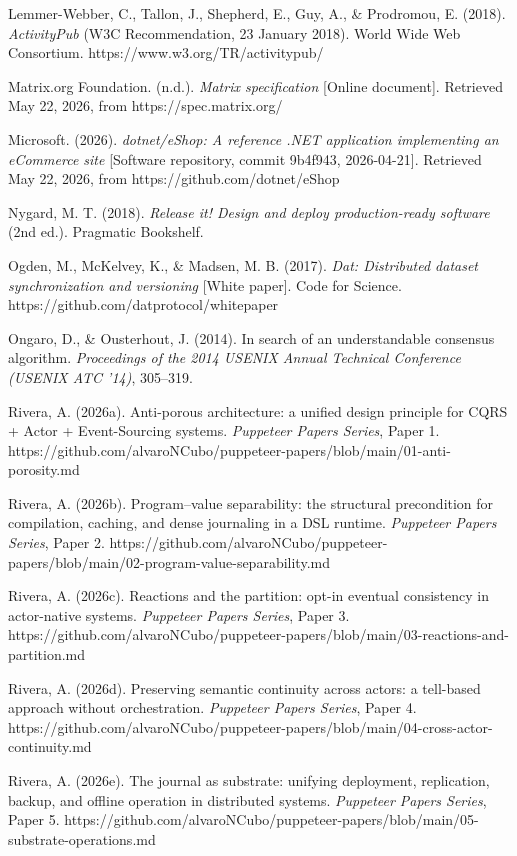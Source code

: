 \documentclass[
]{article}
\begin{document}
Lemmer-Webber, C., Tallon, J., Shepherd, E., Guy, A., \& Prodromou, E.
(2018). \emph{ActivityPub} (W3C Recommendation, 23 January 2018). World
Wide Web Consortium. https://www.w3.org/TR/activitypub/

Matrix.org Foundation. (n.d.). \emph{Matrix specification} {[}Online
document{]}. Retrieved May 22, 2026, from https://spec.matrix.org/

Microsoft. (2026). \emph{dotnet/eShop: A reference .NET application
implementing an eCommerce site} {[}Software repository, commit 9b4f943,
2026-04-21{]}. Retrieved May 22, 2026, from
https://github.com/dotnet/eShop

Nygard, M. T. (2018). \emph{Release it! Design and deploy
production-ready software} (2nd ed.). Pragmatic Bookshelf.

Ogden, M., McKelvey, K., \& Madsen, M. B. (2017). \emph{Dat: Distributed
dataset synchronization and versioning} {[}White paper{]}. Code for
Science. https://github.com/datprotocol/whitepaper

Ongaro, D., \& Ousterhout, J. (2014). In search of an understandable
consensus algorithm. \emph{Proceedings of the 2014 USENIX Annual
Technical Conference (USENIX ATC '14)}, 305--319.

Rivera, A. (2026a). Anti-porous architecture: a unified design principle
for CQRS + Actor + Event-Sourcing systems. \emph{Puppeteer Papers
Series}, Paper 1.
https://github.com/alvaroNCubo/puppeteer-papers/blob/main/01-anti-porosity.md

Rivera, A. (2026b). Program--value separability: the structural
precondition for compilation, caching, and dense journaling in a DSL
runtime. \emph{Puppeteer Papers Series}, Paper 2.
https://github.com/alvaroNCubo/puppeteer-papers/blob/main/02-program-value-separability.md

Rivera, A. (2026c). Reactions and the partition: opt-in eventual
consistency in actor-native systems. \emph{Puppeteer Papers Series},
Paper 3.
https://github.com/alvaroNCubo/puppeteer-papers/blob/main/03-reactions-and-partition.md

Rivera, A. (2026d). Preserving semantic continuity across actors: a
tell-based approach without orchestration. \emph{Puppeteer Papers
Series}, Paper 4.
https://github.com/alvaroNCubo/puppeteer-papers/blob/main/04-cross-actor-continuity.md

Rivera, A. (2026e). The journal as substrate: unifying deployment,
replication, backup, and offline operation in distributed systems.
\emph{Puppeteer Papers Series}, Paper 5.
https://github.com/alvaroNCubo/puppeteer-papers/blob/main/05-substrate-operations.md
\end{document}
